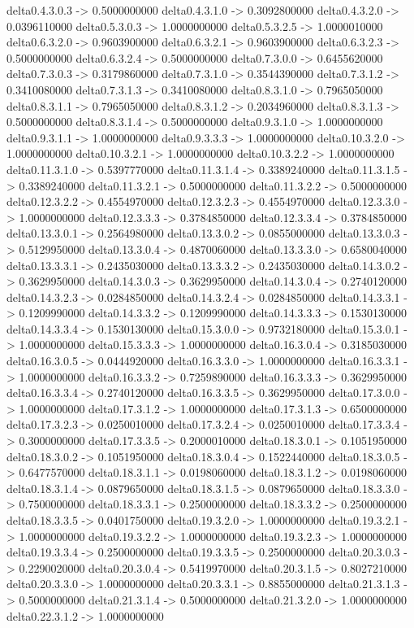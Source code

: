 delta0.4.3.0.3 -> 0.5000000000    delta0.4.3.1.0 -> 0.3092800000    delta0.4.3.2.0 -> 0.0396110000    delta0.5.3.0.3 -> 1.0000000000    delta0.5.3.2.5 -> 1.0000010000    delta0.6.3.2.0 -> 0.9603900000    delta0.6.3.2.1 -> 0.9603900000    delta0.6.3.2.3 -> 0.5000000000    delta0.6.3.2.4 -> 0.5000000000    delta0.7.3.0.0 -> 0.6455620000    delta0.7.3.0.3 -> 0.3179860000    delta0.7.3.1.0 -> 0.3544390000    delta0.7.3.1.2 -> 0.3410080000    delta0.7.3.1.3 -> 0.3410080000    delta0.8.3.1.0 -> 0.7965050000    delta0.8.3.1.1 -> 0.7965050000    delta0.8.3.1.2 -> 0.2034960000    delta0.8.3.1.3 -> 0.5000000000    delta0.8.3.1.4 -> 0.5000000000    delta0.9.3.1.0 -> 1.0000000000    delta0.9.3.1.1 -> 1.0000000000    delta0.9.3.3.3 -> 1.0000000000    delta0.10.3.2.0 -> 1.0000000000    delta0.10.3.2.1 -> 1.0000000000    delta0.10.3.2.2 -> 1.0000000000    delta0.11.3.1.0 -> 0.5397770000    delta0.11.3.1.4 -> 0.3389240000    delta0.11.3.1.5 -> 0.3389240000    delta0.11.3.2.1 -> 0.5000000000    delta0.11.3.2.2 -> 0.5000000000    delta0.12.3.2.2 -> 0.4554970000    delta0.12.3.2.3 -> 0.4554970000    delta0.12.3.3.0 -> 1.0000000000    delta0.12.3.3.3 -> 0.3784850000    delta0.12.3.3.4 -> 0.3784850000    delta0.13.3.0.1 -> 0.2564980000    delta0.13.3.0.2 -> 0.0855000000    delta0.13.3.0.3 -> 0.5129950000    delta0.13.3.0.4 -> 0.4870060000    delta0.13.3.3.0 -> 0.6580040000    delta0.13.3.3.1 -> 0.2435030000    delta0.13.3.3.2 -> 0.2435030000    delta0.14.3.0.2 -> 0.3629950000    delta0.14.3.0.3 -> 0.3629950000    delta0.14.3.0.4 -> 0.2740120000    delta0.14.3.2.3 -> 0.0284850000    delta0.14.3.2.4 -> 0.0284850000    delta0.14.3.3.1 -> 0.1209990000    delta0.14.3.3.2 -> 0.1209990000    delta0.14.3.3.3 -> 0.1530130000    delta0.14.3.3.4 -> 0.1530130000    delta0.15.3.0.0 -> 0.9732180000    delta0.15.3.0.1 -> 1.0000000000    delta0.15.3.3.3 -> 1.0000000000    delta0.16.3.0.4 -> 0.3185030000    delta0.16.3.0.5 -> 0.0444920000    delta0.16.3.3.0 -> 1.0000000000    delta0.16.3.3.1 -> 1.0000000000    delta0.16.3.3.2 -> 0.7259890000    delta0.16.3.3.3 -> 0.3629950000    delta0.16.3.3.4 -> 0.2740120000    delta0.16.3.3.5 -> 0.3629950000    delta0.17.3.0.0 -> 1.0000000000    delta0.17.3.1.2 -> 1.0000000000    delta0.17.3.1.3 -> 0.6500000000    delta0.17.3.2.3 -> 0.0250010000    delta0.17.3.2.4 -> 0.0250010000    delta0.17.3.3.4 -> 0.3000000000    delta0.17.3.3.5 -> 0.2000010000    delta0.18.3.0.1 -> 0.1051950000    delta0.18.3.0.2 -> 0.1051950000    delta0.18.3.0.4 -> 0.1522440000    delta0.18.3.0.5 -> 0.6477570000    delta0.18.3.1.1 -> 0.0198060000    delta0.18.3.1.2 -> 0.0198060000    delta0.18.3.1.4 -> 0.0879650000    delta0.18.3.1.5 -> 0.0879650000    delta0.18.3.3.0 -> 0.7500000000    delta0.18.3.3.1 -> 0.2500000000    delta0.18.3.3.2 -> 0.2500000000    delta0.18.3.3.5 -> 0.0401750000    delta0.19.3.2.0 -> 1.0000000000    delta0.19.3.2.1 -> 1.0000000000    delta0.19.3.2.2 -> 1.0000000000    delta0.19.3.2.3 -> 1.0000000000    delta0.19.3.3.4 -> 0.2500000000    delta0.19.3.3.5 -> 0.2500000000    delta0.20.3.0.3 -> 0.2290020000    delta0.20.3.0.4 -> 0.5419970000    delta0.20.3.1.5 -> 0.8027210000    delta0.20.3.3.0 -> 1.0000000000    delta0.20.3.3.1 -> 0.8855000000    delta0.21.3.1.3 -> 0.5000000000    delta0.21.3.1.4 -> 0.5000000000    delta0.21.3.2.0 -> 1.0000000000    delta0.22.3.1.2 -> 1.0000000000  
